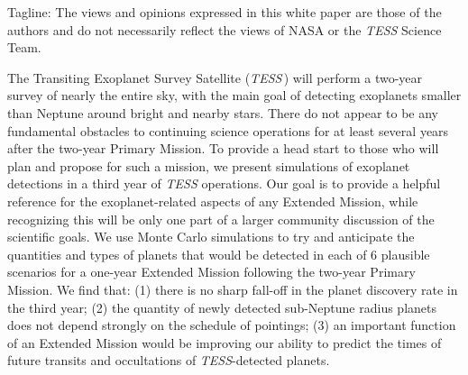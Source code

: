 \documentclass{article}
\begin{document}
Tagline: The views and opinions expressed in this white paper are those of the 
authors and do not necessarily reflect the views of NASA or the {\it TESS}
Science Team.

The Transiting Exoplanet Survey Satellite ({\it TESS}\,) will perform
a two-year survey of nearly the entire sky, with the main goal of detecting
exoplanets smaller than Neptune around bright and nearby stars. There do
not appear to be any fundamental obstacles to continuing science
operations for at least several years after the two-year Primary Mission.
To provide a head start to those who will plan and propose for such a 
mission, we present simulations of exoplanet detections in a third year of {\it 
TESS}
operations. Our goal is to provide a helpful reference for the exoplanet-related
aspects of any Extended Mission, while recognizing this will be only one part of
a larger community discussion of the scientific goals.
We use Monte Carlo simulations to try and anticipate the quantities and types
of planets that would be detected in each of 6 plausible scenarios for a
one-year Extended Mission following the two-year Primary Mission.
We find that: (1) there is no
sharp fall-off in the planet discovery rate in the third year; (2) the quantity 
of newly detected sub-Neptune radius planets
does not depend strongly on the schedule of pointings; (3) an important
function of an Extended Mission would be improving our ability to predict the times of future
transits and occultations of {\it TESS}-detected planets.
\end{document}
